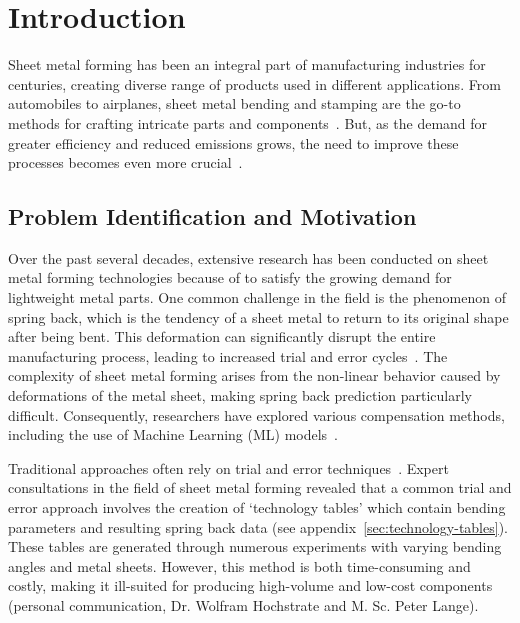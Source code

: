 \chapter{Introduction}\label{ch:introduction}

Sheet metal forming has been an integral part of manufacturing industries for centuries, creating
diverse range of products used in different applications.
From automobiles to airplanes, sheet metal bending and stamping are the go-to methods for
crafting intricate parts and components~\cite[p. 1]{cruz_applicationmachinelearning_2021}.
But, as the demand for greater efficiency and reduced emissions grows, the need to improve these
processes becomes even more crucial~\cite[p. 4]{zheng_reviewformingtechniques_2018}.


\section{Problem Identification and Motivation}\label{sec:problem-identification-and-motivation}
Over the past several decades, extensive research has been conducted on sheet metal forming technologies because of
to satisfy the growing demand for lightweight metal parts.
One common challenge in the field is the phenomenon of spring back, which is the tendency of a sheet metal to return
to its original shape after being bent.
This deformation can significantly disrupt the entire manufacturing process, leading to increased trial and error
cycles~\cite[p. 1]{cruz_applicationmachinelearning_2021}.
The complexity of sheet metal forming arises from the non-linear behavior caused by deformations of the metal sheet,
making spring back prediction particularly difficult.
Consequently, researchers have explored various compensation methods, including the use of Machine Learning (ML)
models~\cite[p.1]{liu_newmachinelearning_2012}.

Traditional approaches often rely on trial and error techniques~\cite[p. 1]{dib_singleensembleclassifiers_2020}.
Expert consultations in the field of sheet metal forming revealed that a common trial and error approach involves the
creation of `technology tables' which contain bending parameters and resulting spring back data
(see appendix~\ref{sec:technology-tables}).
These tables are generated through numerous experiments with varying bending angles and metal sheets.
However, this method is both time-consuming and costly, making it ill-suited for producing high-volume and low-cost
components (personal communication, Dr. Wolfram Hochstrate and M. Sc. Peter Lange).

